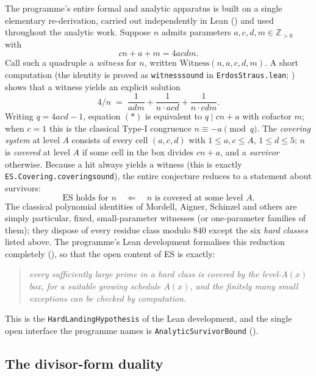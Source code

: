 \documentclass[11pt]{article}
\theoremstyle{plain}
\theoremstyle{definition}
\theoremstyle{remark}
\newcommand{\file}[1]{\texttt{#1}}
\newcommand{\lean}[1]{\texttt{#1}}
\renewcommand{\_}{\textunderscore\allowbreak}
\newcommand{\Z}{\mathbb{Z}}
\begin{document}
The programme's entire formal and analytic apparatus is built on a single elementary
re-derivation, carried out independently in Lean () and used throughout the
analytic work. Suppose $n$ admits parameters $a,c,d,m\in\Z_{>0}$ with
\[
cn+a+m = 4acdm. \tag{$\ast$}
\]
Call such a quadruple a \emph{witness} for $n$, written $\mathrm{Witness}(n,a,c,d,m)$. A short
computation (the identity is proved as \lean{witness\_sound} in \file{ErdosStraus.lean};
) shows that a witness yields an explicit solution
\[
4/n \;=\; \frac{1}{adm} + \frac{1}{n\!\cdot\! acd} + \frac{1}{n\!\cdot\! cdm}.
\]
Writing $q=4acd-1$, equation $(\ast)$ is equivalent to $q\mid cn+a$ with cofactor $m$; when
$c=1$ this is the classical Type-I congruence $n\equiv -a\pmod{q}$. The \emph{covering system}
at level $A$ consists of every cell $(a,c,d)$ with $1\le a,c\le A$, $1\le d\le 5$; $n$ is
\emph{covered} at level $A$ if some cell in the box divides $cn+a$, and a \emph{survivor}
otherwise. Because a hit always yields a witness (this is exactly
\lean{ES.Covering.covering\_sound}), the entire conjecture reduces to a statement about
survivors:
\[
\text{ES holds for } n \quad\Longleftarrow\quad n \text{ is covered at some level } A.
\]
The classical polynomial identities of Mordell, Aigner, Schinzel and others are simply
particular, fixed, small-parameter witnesses (or one-parameter families of them); they dispose
of every residue class modulo $840$ except the six \emph{hard classes} listed above. The
programme's Lean development formalises this reduction completely (),
so that the open content of ES is exactly:
\begin{quote}
\itshape every sufficiently large prime in a hard class is covered by the level-$A(x)$ box, for
a suitable growing schedule $A(x)$, and the finitely many small exceptions can be checked by
computation.
\end{quote}
This is the \lean{HardLandingHypothesis} of the Lean development, and the single open interface
the programme names is \lean{AnalyticSurvivorBound} ().

\subsection{The divisor-form duality}
\end{document}
